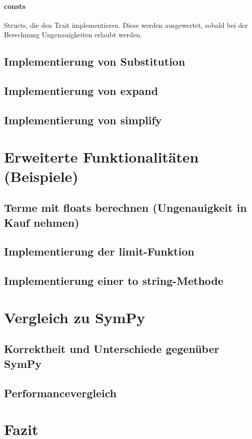 \documentclass[11pt,a4paper, ngerman]{article}
\begin{document}
\paragraph{consts} Structs, die den Trait  implementieren. Diese werden ausgewertet, sobald bei der Berechnung Ungenauigkeiten erlaubt werden.

\subsection{Implementierung von Substitution}
\subsection{Implementierung von expand}
\subsection{Implementierung von simplify}

\newpage

\section{Erweiterte Funktionalitäten (Beispiele)}
\subsection{Terme mit floats berechnen (Ungenauigkeit in Kauf nehmen)}
\subsection{Implementierung der limit-Funktion}
\subsection{Implementierung einer to string-Methode}

\newpage

\section{Vergleich zu SymPy}
\subsection{Korrektheit und Unterschiede gegenüber SymPy}
\subsection{Performancevergleich}

\newpage

\section{Fazit}

\newpage

\raggedright

\end{document}
